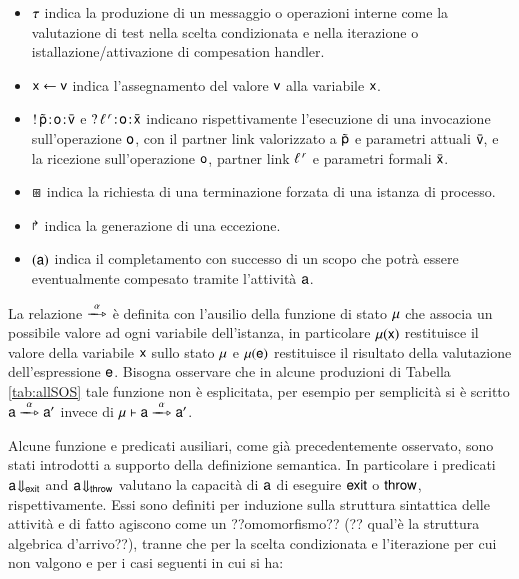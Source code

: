 \begin{itemize}
  \item $\tau$ indica la produzione di un messaggio o operazioni interne come
  la valutazione di test nella scelta condizionata e nella iterazione
  o istallazione/attivazione di compesation handler.
  \item ${\sf x} \leftarrow {\sf v}$ indica l'assegnamento del valore ${\sf v}$ alla
  variabile ${\sf x}$.
  \item $!\,\tilde{{\sf p}}\! : \! {\sf o}\! : \! \bar{{\sf v}}$ e
  $?\,\ell^{\,r}\! : \! {\sf o}\! : \! \bar{{\sf x}}$  indicano rispettivamente l'esecuzione di
  una invocazione sull'operazione ${\sf o}$, con il partner link valorizzato a
  $\tilde{{\sf p}}$ e parametri attuali $\bar{{\sf v}}$, e la ricezione sull'operazione
  ${\sf o}$, partner link $\ell^{\,r}$ e parametri formali $\bar{{\sf x}}$.
  \item $\boxast$ indica la richiesta di una terminazione forzata di una
  istanza di processo.
  \item $\Rsh$ indica la generazione di una eccezione.
  \item $({\sf a})$ indica il completamento con successo di un scopo
  che potrà essere eventualmente compesato tramite l'attività ${\sf a}$.
\end{itemize}

La relazione $\bpeltsarrow{\xalpha}$ è definita con l'ausilio della funzione di
stato ${\sf \mu}$ che associa un possibile valore ad ogni variabile dell'istanza,
in particolare ${\sf \mu}({\sf x})$ restituisce il valore della variabile ${\sf x}$ sullo
stato ${\sf \mu}$ e ${\sf \mu}({\sf e})$ restituisce il risultato della
valutazione dell'espressione ${\sf e}$. Bisogna osservare che in alcune produzioni di
Tabella \ref{tab:allSOS} tale funzione non è esplicitata, per esempio per
semplicità si è scritto $\xinstnostate{\xsigma}{\xs}
\bpeltsarrow{\xalpha} \xinstnostate{\xsigma}{\xs'}$ invece di $\xinst{\xsigma}{\xs} \bpeltsarrow{\xalpha}
\xinstnostate{\xsigma}{\xs'}$.

Alcune funzione e predicati ausiliari, come già precedentemente osservato, sono
stati introdotti a supporto della definizione semantica. In particolare i
predicati ${\sf a}\!\Downarrow_{{\sf exit}}$ and ${\sf a}\!\Downarrow_{{\sf throw}}$ valutano la capacità di 
${\sf a}$ di eseguire ${\sf exit}$ o ${\sf throw}$, rispettivamente. Essi sono definiti per
induzione sulla struttura sintattica delle attività e di fatto agiscono come un
??omomorfismo?? (?? qual'è la struttura algebrica d'arrivo??), tranne che per la
scelta condizionata e l'iterazione per cui non valgono e per i casi seguenti in cui si ha:

